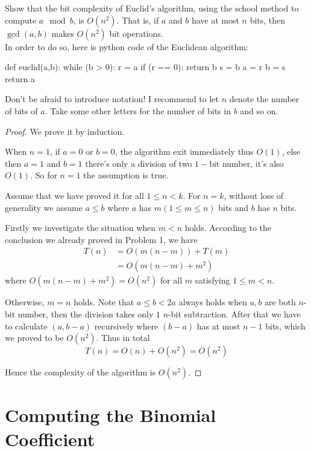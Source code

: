 \documentclass[11pt,a4paper,oneside]{article}
\begin{document}
\begin{problem}{2}
\statement
Show that the bit complexity of Euclid's algorithm, using the school method
to compute $a \mod b$, is $O(n^2)$. That is,
if $a$ and $b$ have at most $n$ bits, then $\gcd(a,b)$ makes $O(n^2)$ bit operations.\\

In order to do so, here is python code of the Euclidean algorithm:
\begin{python}
def euclid(a,b):
	while (b > 0):
		r = a %
		if (r == 0):
			return b
		s = b %
		a = r
		b = s
  	return a
\end{python}
Don't be afraid to introduce notation! I recommend to let $n$ denote the number of bits of $a$.
Take some other letters for the number of bits in $b$ and so on.
\solution
\begin{proof}
	
We prove it by induction.

When \(n = 1\), if $a = 0$ or $b = 0$, the algorithm exit immediately thus $O(1)$, else then $a = 1$ and $b = 1$ there's only a division of two $1-$bit number, it's also $O(1)$. So for $n = 1$ the assumption is true.

Assume that we have proved it for all \(1 \leq n < k \). For \( n=k\), without loss of generality we assume $a \leq b$ where $a$ has $m(1 \leq m \leq n)$ bits and $b$ has $n$ bits. 

Firstly we investigate the situation when $m < n$ holds. According to the conclusion we already proved in Problem 1, we have
\[
	\begin{split}
		T(n) &= O(m(n - m)) + T(m) \\
		&= O(m(n-m) + m^2)
	\end{split}
\]
where \( O(m(n - m) + m^2) = O(n^2)\) for all \(m\) satisfying \(1 \leq m < n\).

Otherwise, $m = n$ holds. Note that $a \leq b < 2a$ always holds when $a, b$ are both $n$-bit number, then the division takes only $1$ $n$-bit subtraction.
After that we have to calculate $(a, b - a)$ recursively where $(b - a)$ has at most $n - 1$ bits, which we proved to be $O(n ^ 2)$. Thus in total
\[
	T(n) = O(n) + O(n ^ 2) = O(n^2)
\]

Hence the complexity of the algorithm is \(O(n^2)\).

\end{proof}
\end{problem}

\section*{Computing the Binomial Coefficient}
\end{document}
